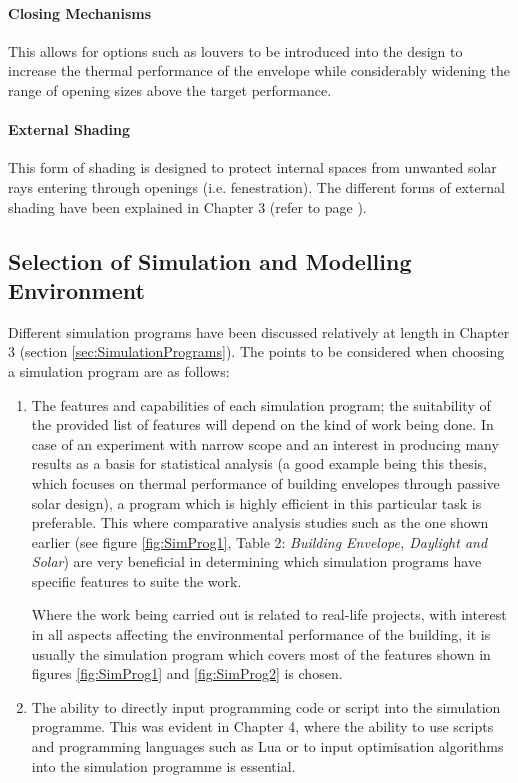 \paragraph{Closing Mechanisms}\mbox{}

This allows for options such as louvers to be introduced into the design to increase the thermal performance of the envelope while considerably widening the range of opening sizes above the target performance.

\paragraph{External Shading}\mbox{}

This form of shading is designed to protect internal spaces from unwanted solar rays entering through openings (i.e. fenestration). The different forms of external shading have been explained in Chapter 3 (refer to page \pageref{Shading}).

\subsection{Selection of Simulation and Modelling Environment}
\label{sec:SimulationModel}

Different simulation programs have been discussed relatively at length in Chapter 3 (section \ref{sec:SimulationPrograms}). The points to be considered when choosing a simulation program are as follows:

\begin{enumerate}
	\item The features and capabilities of each simulation program; the suitability of the provided list of features will depend on the kind of work being done. In case of an experiment with narrow scope and an interest in producing many results as a basis for statistical analysis (a good example being this thesis, which focuses on thermal performance of building envelopes through passive solar design), a program which is highly efficient in this particular task is preferable. This where comparative analysis studies such as the one shown earlier (see figure \ref{fig:SimProg1}, Table 2: \emph{Building Envelope, Daylight and Solar}) are very beneficial in determining which simulation programs have specific features to suite the work.

		Where the work being carried out is related to real-life projects, with interest in all aspects affecting the environmental performance of the building, it is usually the simulation program which covers most of the features shown in figures \ref{fig:SimProg1} and \ref{fig:SimProg2} is chosen.
	
	\item The ability to directly input programming code or script into the simulation programme. This was evident in Chapter 4, where the ability to use scripts and programming languages such as Lua or to input optimisation algorithms into the simulation programme is essential.
\end{enumerate}

